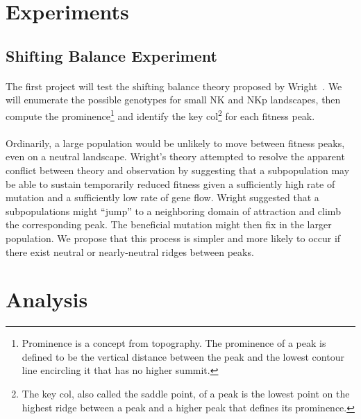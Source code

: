 \documentclass[12pt,letterpaper,titlepage,draft]{article}
\begin{document}
\section{Experiments}

\subsection{Shifting Balance Experiment}

\paragraph{}
The first project will test the shifting balance theory proposed by
Wright~\cite{Wright1982}\cite{Wright1931}. We will enumerate the possible
genotypes for small NK and NKp landscapes, then compute the
prominence\footnote{Prominence is a concept from topography. The prominence of
a peak is defined to be the vertical distance between the peak and the
lowest contour line encircling it that has no higher summit.} and identify the
key col\footnote{The key col, also called the saddle point, of a peak is the
lowest point on the highest ridge between a peak and a higher peak that
defines its prominence.} for each fitness peak.

\paragraph{}
Ordinarily, a large population would be unlikely to move between fitness peaks,
even on a neutral landscape. Wright's theory attempted to resolve the apparent
conflict between theory and observation by suggesting that a subpopulation may
be able to sustain temporarily reduced fitness given a sufficiently high rate
of mutation and a sufficiently low rate of gene flow. Wright suggested that a
subpopulations might ``jump'' to a neighboring domain of attraction and climb
the corresponding peak. The beneficial mutation might then fix in the larger
population. We propose that this process is simpler and more likely to occur if
there exist neutral or nearly-neutral ridges between peaks.

\section{Analysis}


{}
\end{document}
